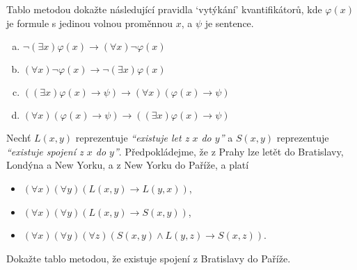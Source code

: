 \begin{problem}
    
    Tablo metodou dokažte následující pravidla `vytýkání' kvantifikátorů, kde $\varphi(x)$ je formule s jedinou volnou proměnnou $x$, a $\psi$ je sentence.

    \vspace{-6pt}
    \begin{multicols}{2}
        \begin{enumerate}[(a)]        
            \item $\neg(\exists x)\varphi(x)\to (\forall x)\neg \varphi(x)$
            \item $(\forall x)\neg \varphi(x)\to \neg(\exists x)\varphi(x)$
            \item $((\exists x)\varphi(x)\to\psi)\to(\forall x)(\varphi(x)\to \psi)$       
            \item $(\forall x)(\varphi(x)\to\psi)\to((\exists x)\varphi(x)\to \psi)$            
        \end{enumerate}
    \end{multicols}
    \vspace{-6pt}
    
\end{problem}


\begin{problem} 
    
    Nechť $L(x,y)$ reprezentuje \emph{``existuje let z $x$ do $y$''} a $S(x,y)$ reprezentuje \emph{``existuje spojení z $x$ do $y$''}. Předpokládejme, že z Prahy lze letět do Bratislavy, Londýna a New Yorku, a z New Yorku do Paříže, a platí
    \begin{itemize}  
        \item $(\forall x)(\forall y)(L(x,y) \to L(y,x))$,
        \item $(\forall x)(\forall y)(L(x,y)\to S(x,y))$,
        \item $(\forall x)(\forall y)(\forall z)(S(x,y)\wedge L(y,z)\to S(x,z))$.
    \end{itemize}
    Dokažte tablo metodou, že existuje spojení z Bratislavy do Paříže.

\end{problem}



